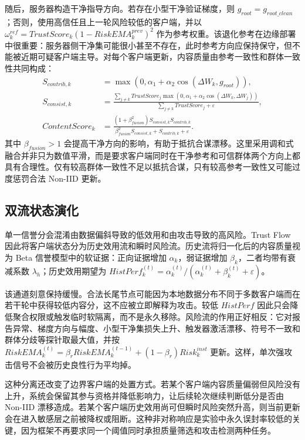 \documentclass[10pt,a4paper,UTF8,fontset=fandol]{ctexart}
\begin{document}
随后，服务器构造干净指导方向。若存在小型干净验证梯度，则 $g_{root}=g_{root\_clean}$；否则，使用高信任且上一轮风险较低的客户端，并以 $\omega_k^{ref}=TrustScore_k(1-RiskEMA_k^{prev})^2$ 作为参考权重。该退化参考在边缘部署中很重要：服务器侧干净集可能很小甚至不存在，此时参考方向应保持保守，但不能被近期可疑客户端主导。对每个客户端更新，内容质量由参考一致性和群体一致性共同构成：
\begin{align}
S_{contrib,k}&=\max(0,\alpha_1+\alpha_2\cos(\Delta W_k,g_{root})),\\
S_{consist,k}&=\frac{\sum_{j\ne k}TrustScore_j\max(0,\alpha_1+\alpha_2\cos(\Delta W_k,\Delta W_j))}
{\sum_{j\ne k}TrustScore_j+\varepsilon},\\
ContentScore_k&=\frac{(1+\beta_{fusion}^2)S_{consist,k}S_{contrib,k}}
{\beta_{fusion}^2S_{consist,k}+S_{contrib,k}+\varepsilon}.
\end{align}
其中 $\beta_{fusion}>1$ 会提高干净方向的影响，有助于抵抗合谋漂移。这里采用调和式融合并非只为数值平滑，而是要求客户端同时在干净参考和可信群体两个方向上都具有合理性。仅有较高群体一致性不足以抵抗合谋，只有较高参考一致性又可能过度惩罚合法 Non-IID 更新。

\subsection{双流状态演化}

单一信誉分会混淆由数据偏斜导致的低效用和由攻击导致的高风险。Trust Flow 因此将客户端状态分为历史效用流和瞬时风险流。历史流将归一化后的内容质量视为 Beta 信誉模型中的软证据：正向证据增加 $\alpha_k$，弱证据增加 $\beta_k$，二者均带有衰减系数 $\lambda_h$；历史效用期望为 $HistPerf_k^{(t)}=\alpha_k^{(t)}/(\alpha_k^{(t)}+\beta_k^{(t)}+\varepsilon)$。

该通道刻意保持缓慢。合法长尾节点可能因为本地数据分布不同于多数客户端而在若干轮中获得较低内容分，这不应被立即解释为攻击。较低 $HistPerf$ 因此只会降低聚合权限或触发临时软隔离，而不是永久移除。风险流的作用正好相反：它对报告异常、梯度方向与幅度、小型干净集损失上升、触发器激活漂移、符号不一致和群体分歧等探针取最大值，并按 $RiskEMA_k^{(t)}=\beta_rRiskEMA_k^{(t-1)}+(1-\beta_r)Risk_k^{inst}$ 更新。这样，单次强攻击信号不会被历史良性行为平均掉。

这种分离还改变了边界客户端的处置方式。若某个客户端内容质量偏弱但风险没有上升，系统会保留其参与资格并降低影响力，让后续轮次继续判断低分是否由 Non-IID 漂移造成。若某个客户端历史效用尚可但瞬时风险突然升高，则当前更新会在进入敏感层之前被降权或阻断。这种非对称响应是实验中永久误封率较低的关键，因为框架不再要求同一个阈值同时承担质量筛选和攻击检测两种任务。
\end{document}
